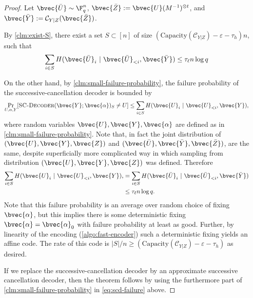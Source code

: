 \documentclass[11pt]{article}
\newcommand{\cC}{\mathcal{C}}
\newcommand{\two}{}
\begin{document}
\begin{proof}
	Let $\bvec{\bar U} \sim \F_q^n$, $\bvec{\bar Z} := \bvec{U} (M^{-1})^{\otimes t}$,
	and $\bvec{\bar Y} := \cC_{Y|Z}(\bvec{\bar Z})$.
	
	By \cref{clm:exist-S},
	there exist a set $S \subset [n]$ of size $(\text{Capacity}(\cC_{Y|Z}) -
	\varepsilon - \two\tau_h) n$, such that
	\begin{align*}
		\sum_{i \in S} H( \bvec{\bar U}_{i} ~|~ \bvec{\bar U}_{< i}, \bvec{\bar Y}) \leq \tau_\ell n \log q
	\end{align*}
	
	
	On the other hand, by \cref{clm:small-failure-probability}, the failure probability of
	the successive-cancellation decoder is bounded by
	\begin{equation}\label{eq:scd-failure}
		\Pr_{U, \alpha, Y}[
		\text{\sc SC-Decoder}(\bvec{Y}; \bvec{\alpha})_S \neq U ]
		\leq  \sum_{i \in S} H( \bvec{U}_{i} ~|~ \bvec{U}_{< i}, \bvec{Y}),
	\end{equation}
	where random variables $\bvec{U}, \bvec{Y}, \bvec{\alpha}$
	are defined as in \cref{clm:small-failure-probability}. Note that, in fact the joint distribution of $(\bvec{U}, \bvec{Y}, \bvec{Z})$ and $(\bvec{\bar{U}}, \bvec{\bar{Y}}, \bvec{\bar{Z}})$, are the same, despite superficially more complicated way in which sampling from distribution $(\bvec{U}, \bvec{Y}, \bvec{Z})$ was defined. Therefore
	\begin{align*}
		\sum_{i \in S} H( \bvec{U}_{i} ~|~ \bvec{U}_{< i}, \bvec{Y}),
		&=  \sum_{i \in S} H( \bvec{\bar U}_{i} ~|~ \bvec{\bar U}_{< i}, \bvec{\bar Y})\\
		&\leq \tau_\ell n \log q.
	\end{align*}
	Note that this failure probability is an average over random choice
	of fixing $\bvec{\alpha}$,
	but this implies there is some deterministic fixing $\bvec{\alpha} = \bvec{\alpha}_0$ with
	failure probability at least as good. Further, by linearity of the encoding
	(\cref{algo:fast-encoder})
	such a deterministic fixing yields an affine code.
	The rate of this code is $|S|/n \geq (\text{Capacity}(\cC_{Y|Z}) - \varepsilon -
	\two\tau_h)$ as desired.
	
	If we replace the successive-cancellation decoder by an approximate successive cancellation decoder, then the theorem follows by using the furthermore part of \cref{clm:small-failure-probability} in \cref{eq:scd-failure} above.
\end{proof}
\end{document}
